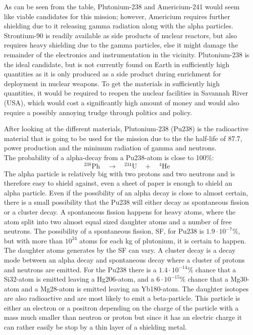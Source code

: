 As can be seen from the table, Plutonium-238 and Americium-241 would seem like viable candidates for this mission; however, Americium requires further shielding due to it releasing gamma radiation along with the alpha particles. Strontium-90 is readily available as side products of nuclear reactors, but also requires heavy shielding due to the gamma particles, else it might damage the remainder of the electronics and instrumentation in the vicinity. Plutonium-238 is the ideal candidate, but is not currently found on Earth in sufficiently high quantities as it is only produced as a side product during enrichment for deployment in nuclear weapons. To get the materials in sufficiently high quantities, it would be required to reopen the nuclear facilities in Savannah River (USA), which would cost a significantly high amount of money and would also require a possibly annoying trudge through politics and policy.

\label{sec:plutonium}
After looking at the different materials, Plutonium-238 (Pu238) is the radioactive material that is going to be used for the mission due to the the half-life of 87.7, power production and the minimum radiation of gamma and neutrons. \\

\noindent
The probability of a alpha-decay from a Pu238-atom is close to 100\%: 
\begin{equation}
^{238}\text{Ph} \quad \rightarrow \quad ^{234}\text{U} \quad + \quad ^4 \text{He}
\end{equation}
The alpha particle is relatively big with two protons and two neutrons and is therefore easy to shield against, even a sheet of paper is enough to shield an alpha particle\cite{website:shielding}. Even if the possibility of an alpha decay is close to almost certain, there is a small possibility that the Pu238 will either decay as spontaneous fission or a cluster decay\cite{website:plutonium}. A spontaneous fission happens for heavy atoms, where the atom split into two almost equal sized daughter atoms and a number of free neutrons\cite{website:spontaneous_fission}. The possibility of a spontaneous fission, SF, for Pu238 is $1.9 \cdot 10^{-7}\%$, but with more than $10^{24}$ atoms for each kg of plutonium, it is certain to happen. The daughter atoms generates by the SF can vary. A cluster decay is a decay mode between an alpha decay and spontaneous decay where a cluster of protons and neutrons are emitted. For the Pu238 there is a $1.4 \cdot 10^{-14}\%$ chance that a Si32-atom is emitted leaving a Hg206-atom, and a $6 \cdot 10^{-15}\%$ chance that a Mg30-atom and a Mg28-atom is emitted leaving an Yb180-atom. The daughter isotopes are also radioactive and are most likely to emit a beta-particle. This particle is either an electron or a positron depending on the charge of the particle with a mass much smaller than neutron or proton but since it has an electric charge it can rather easily be stop by a thin layer of a shielding metal. \\

